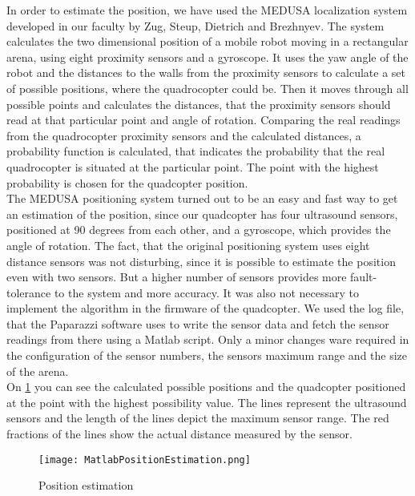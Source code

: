 In order to estimate the position, we have used the MEDUSA localization system developed in our faculty by Zug, Steup, Dietrich and Brezhnyev\cite{Zug2011RobLoc}. 
The system calculates the two dimensional position of a mobile robot moving in a rectangular arena, using eight proximity sensors and a gyroscope. 
It uses the yaw angle of the robot and the distances to the walls from the proximity sensors to calculate a set of possible positions, where the quadrocopter could be. 
Then it moves through all possible points and calculates the distances, that the proximity sensors should read at that particular point and angle of rotation. 
Comparing the real readings from the quadrocopter proximity sensors and the calculated distances, a probability function is calculated, that indicates the probability that the real quadrocopter is situated at the particular point. 
The point with the highest probability is chosen for the quadcopter position.\\

The MEDUSA positioning system turned out to be an easy and fast way to get an estimation of the position, since our quadcopter has four ultrasound sensors, positioned at 90 degrees from each other, and a gyroscope, which provides the angle of rotation. 
The fact, that the original positioning system uses eight distance sensors was not disturbing, since it is possible to estimate the position even with two sensors. 
But a higher number of sensors provides more fault-tolerance to the system and more accuracy. 
It was also not necessary to implement the algorithm in the firmware of the quadcopter. 
We used the log file, that the Paparazzi software uses to write the sensor data and fetch the sensor readings from there using a Matlab script. 
Only a minor changes ware required in the configuration of the sensor numbers, the sensors maximum range and the size of the arena.\\

On \ref{fig:matlabPosEstimation} you can see the calculated possible positions and the quadcopter positioned at the point with the highest possibility value. 
The lines represent the ultrasound sensors and the length of the lines depict the maximum sensor range. 
The red fractions of the lines show the actual distance measured by the sensor. 

\begin{figure}[h!]
 \begin{center}
  \texttt{[image: MatlabPositionEstimation.png]}
 \end{center}
  \caption{Position estimation\label{fig:matlabPosEstimation}}
\end{figure}

